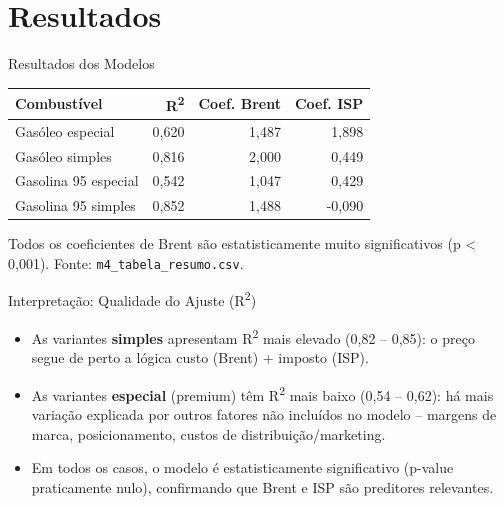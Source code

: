 \documentclass{beamer}
\begin{document}
\section{Resultados}
\begin{frame}{Resultados dos Modelos}
  \small
  \begin{table}
    \centering
    \begin{tabular}{lrrr}
      \toprule
      Combustível & R\textsuperscript{2} & Coef. Brent & Coef. ISP \\
      \midrule
      Gasóleo especial & 0,620 & 1,487 & 1,898 \\
      Gasóleo simples & 0,816 & 2,000 & 0,449 \\
      Gasolina 95 especial & 0,542 & 1,047 & 0,429 \\
      Gasolina 95 simples & 0,852 & 1,488 & -0,090 \\
      \bottomrule
    \end{tabular}
  \end{table}
  \vspace{0.3cm}
  \footnotesize{Todos os coeficientes de Brent são estatisticamente muito significativos (p < 0,001). Fonte: \texttt{m4\_tabela\_resumo.csv}.}
\end{frame}

\begin{frame}{Interpretação: Qualidade do Ajuste (R\textsuperscript{2})}
  \begin{itemize}
    \item As variantes \textbf{simples} apresentam R\textsuperscript{2} mais elevado (0,82 -- 0,85): o preço segue de perto a lógica custo (Brent) + imposto (ISP).
    \item As variantes \textbf{especial} (premium) têm R\textsuperscript{2} mais baixo (0,54 -- 0,62): há mais variação explicada por outros fatores não incluídos no modelo -- margens de marca, posicionamento, custos de distribuição/marketing.
    \item Em todos os casos, o modelo é estatisticamente significativo (p-value praticamente nulo), confirmando que Brent e ISP são preditores relevantes.
  \end{itemize}
\end{frame}
\end{document}
